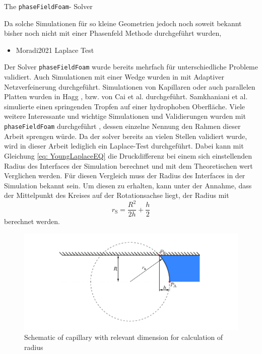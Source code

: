 The \texttt{phaseFieldFoam}- Solver 

Da solche Simulationen für so kleine Geometrien jedoch noch soweit bekannt bisher noch nicht mit einer Phasenfeld Methode durchgeführt wurden, 

\begin{itemize}
    \item Moradi2021 Laplace Test
\end{itemize}


Der Solver \texttt{phaseFieldFoam} wurde bereits mehrfach für unterschiedliche Probleme validiert. Auch Simulationen mit einer Wedge wurden in \cite{holzinger2021DirectNumericalSimulation} mit Adaptiver Netzverfeinerung durchgeführt. Simulationen von Kapillaren oder auch parallelen Platten wurden in Hagg \cite{hagg2019DirekteNumerischeSimulation}, bzw. von Cai et al. \cite{cai2015NumericalSimulationWetting} durchgeführt. Samkhaniani et al. \cite{samkhaniani2021BouncingDropImpingement} simulierte einen springenden Tropfen auf einer hydrophoben Oberfläche. Viele weitere Interessante und wichtige Simulationen und Validierungen wurden mit \texttt{phaseFieldFoam} durchgeführt \cite{bodziony2023StressfulWayDroplets,yinDirectNumericalSimulation,worner2021SpreadingReboundDynamics,bagheriInterfacialRelaxationCrucial2022}, dessen einzelne Nennung den Rahmen dieser Arbeit sprengen würde. 
Da der solver bereits an vielen Stellen validiert wurde, wird in dieser Arbeit lediglich ein Laplace-Test durchgeführt. Dabei kann mit Gleichung \ref{eq: YoungLaplaceEQ} die Druckdifferenz bei einem sich einstellenden Radius des Interfaces der Simulation berechnet und mit dem Theoretischen wert Verglichen werden. Für diesen Vergleich muss der Radius des Interfaces in der Simulation bekannt sein. Um diesen zu erhalten, kann unter der Annahme, dass der Mittelpunkt des Kreises auf der Rotationsachse liegt, der Radius mit 
\begin{equation}
    r_{\mathrm{S}} = \frac{R^2}{2h}+\frac{h}{2}
\end{equation}
berechnet werden. 
\begin{figure}[h]
    \centering
    \includegraphics[width=.95\textwidth]{Pictures/RadiusCalc.pdf}
    \caption{Schematic of capillary with relevant dimension for calculation of radius}
    \label{fig: RadiusCalc}
\end{figure}

